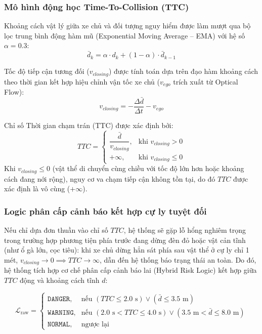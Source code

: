 \subsubsection{Mô hình động học Time-To-Collision (TTC)}
Khoảng cách vật lý giữa xe chủ và đối tượng nguy hiểm được làm mượt qua bộ lọc trung bình động hàm mũ (Exponential Moving Average -- EMA) với hệ số $\alpha = 0.3$:
\begin{equation}
\label{eq:ema_distance}
\bar{d}_k = \alpha \cdot d_k + (1 - \alpha) \cdot \bar{d}_{k-1}
\end{equation}

Tốc độ tiếp cận tương đối ($v_{closing}$) được tính toán dựa trên đạo hàm khoảng cách theo thời gian kết hợp hiệu chỉnh vận tốc xe chủ ($v_{ego}$ trích xuất từ Optical Flow):
\begin{equation}
\label{eq:closing_speed}
v_{closing} = -\frac{\Delta \bar{d}}{\Delta t} - v_{ego}
\end{equation}

Chỉ số Thời gian chạm trán (TTC) được xác định bởi:
\begin{equation}
\label{eq:ttc_formula}
TTC = \begin{cases}
\dfrac{\bar{d}}{v_{closing}}, & \text{khi } v_{closing} > 0 \\
+\infty, & \text{khi } v_{closing} \le 0
\end{cases}
\end{equation}
Khi $v_{closing} \le 0$ (vật thể di chuyển cùng chiều với tốc độ lớn hơn hoặc khoảng cách đang nới rộng), nguy cơ va chạm tiếp cận không tồn tại, do đó $TTC$ được xác định là vô cùng ($+\infty$).

\subsubsection{Logic phân cấp cảnh báo kết hợp cự ly tuyệt đối}
Nếu chỉ dựa đơn thuần vào chỉ số $TTC$, hệ thống sẽ gặp lỗ hổng nghiêm trọng trong trường hợp phương tiện phía trước đang dừng đèn đỏ hoặc vật cản tĩnh (như ổ gà lớn, cọc tiêu): khi xe chủ dừng hẳn sát phía sau vật thể ở cự ly chỉ 1 mét, $v_{closing} \to 0 \implies TTC \to \infty$, dẫn đến hệ thống báo trạng thái an toàn. Do đó, hệ thống tích hợp cơ chế phân cấp cảnh báo lai (Hybrid Risk Logic) kết hợp giữa $TTC$ động và khoảng cách tĩnh $d$:

\begin{equation}
\label{eq:risk_level}
\mathcal{L}_{\text{raw}} = \begin{cases}
\texttt{DANGER}, & \text{nếu } (TTC \le 2.0\text{ s}) \lor (\bar{d} \le 3.5\text{ m}) \\
\texttt{WARNING}, & \text{nếu } (2.0\text{ s} < TTC \le 4.0\text{ s}) \lor (3.5\text{ m} < \bar{d} \le 8.0\text{ m}) \\
\texttt{NORMAL}, & \text{ngược lại}
\end{cases}
\end{equation}

